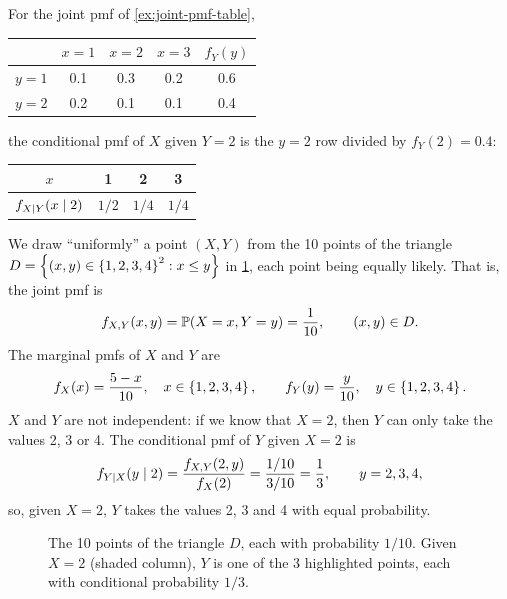 \begin{example}\label{ex:conditional-pmf-table}
For the joint pmf of \cref{ex:joint-pmf-table},
\begin{center}
\renewcommand{\arraystretch}{1.25}
\begin{tabular}{@{}c|ccc|c@{}}
 & $x = 1$ & $x = 2$ & $x = 3$ & $f_Y(y)$ \\
\hline
$y = 1$ & 0.1 & 0.3 & 0.2 & 0.6 \\
$y = 2$ & 0.2 & 0.1 & 0.1 & 0.4 \\
\end{tabular}
\end{center}
the conditional pmf of $X$ given $Y = 2$ is the $y = 2$ row divided by $f_Y(2) = 0.4$:
\begin{center}
\renewcommand{\arraystretch}{1.25}
\begin{tabular}{c|ccc}
$x$ & 1 & 2 & 3 \\
\hline
$f_{X \mid Y}(x \mid 2)$ & $1/2$ & $1/4$ & $1/4$ \\
\end{tabular}
\end{center}
\end{example}

\begin{example}\label{ex:discrete-triangle}
We draw ``uniformly'' a point $(X, Y)$ from the 10 points of the triangle $D = \left\{ (x, y) \in \left\{ 1, 2, 3, 4 \right\}^2 : x \le y \right\}$ in \cref{fig:discrete-triangle}, each point being equally likely. That is, the joint pmf is
\[
  f_{X,Y}(x, y) = \mathbb{P}(X = x, Y = y) = \frac{1}{10}, \qquad (x, y) \in D.
\]
The marginal pmfs of $X$ and $Y$ are
\[
  f_X(x) = \frac{5 - x}{10}, \quad x \in \left\{ 1, 2, 3, 4 \right\}, \qquad f_Y(y) = \frac{y}{10}, \quad y \in \left\{ 1, 2, 3, 4 \right\}.
\]
$X$ and $Y$ are not independent: if we know that $X = 2$, then $Y$ can only take the values 2, 3 or 4. The conditional pmf of $Y$ given $X = 2$ is
\[
  f_{Y \mid X}(y \mid 2) = \frac{f_{X,Y}(2, y)}{f_X(2)} = \frac{1/10}{3/10} = \frac13, \qquad y = 2, 3, 4,
\]
so, given $X = 2$, $Y$ takes the values 2, 3 and 4 with equal probability.
\end{example}

\begin{figure}[H]
\centering
{}
\caption{The 10 points of the triangle $D$, each with probability $1/10$. Given $X = 2$ (shaded column), $Y$ is one of the 3 highlighted points, each with conditional probability $1/3$.}
\label{fig:discrete-triangle}
\end{figure}

